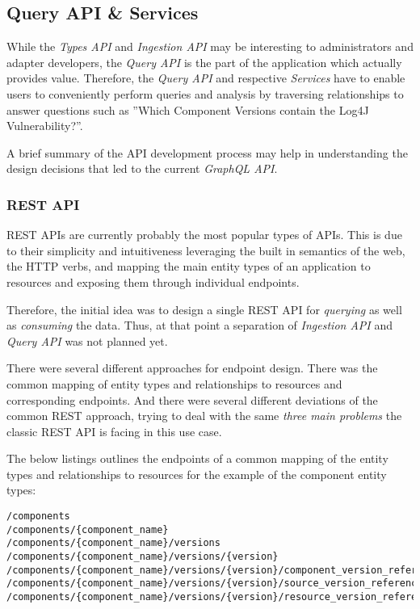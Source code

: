\subsection{Query API \& Services} \label{sec:Query API & Services}
While the \emph{Types API} and \emph{Ingestion API} may be interesting to administrators and adapter developers, the \emph{Query API} is the part of the application which actually provides value. Therefore, the \emph{Query API} and respective \emph{Services} have to enable users to conveniently perform queries and analysis by traversing relationships to answer questions such as ''Which Component Versions contain the Log4J Vulnerability?''.\par
A brief summary of the API development process may help in understanding the design decisions that led to the current \emph{GraphQL API}. 

\subsubsection{REST API}
REST APIs are currently probably the most popular types of APIs. This is due to their simplicity and intuitiveness leveraging the built in semantics of the web, the HTTP verbs, and mapping the main entity types of an application to resources and exposing them through individual endpoints.\par
Therefore, the initial idea was to design a single REST API for \emph{querying} as well as \emph{consuming} the data. Thus, at that point a separation of \emph{Ingestion API} and \emph{Query API} was not planned yet.\par 
There were several different approaches for endpoint design. There was the common mapping of entity types and relationships to resources and corresponding endpoints. And there were several different deviations of the common REST approach, trying to deal with the same \emph{three main problems} the classic REST API is facing in this use case.\par 
The below listings outlines the endpoints of a common mapping of the entity types and relationships to resources for the example of the component entity types:

\begin{lstlisting}[basicstyle=\tiny, caption=REST API Endpoints, captionpos=b, label=lst:RESTAPIEndpoints]
/components
/components/{component_name}
/components/{component_name}/versions
/components/{component_name}/versions/{version}
/components/{component_name}/versions/{version}/component_version_references
/components/{component_name}/versions/{version}/source_version_references
/components/{component_name}/versions/{version}/resource_version_references
\end{lstlisting}

